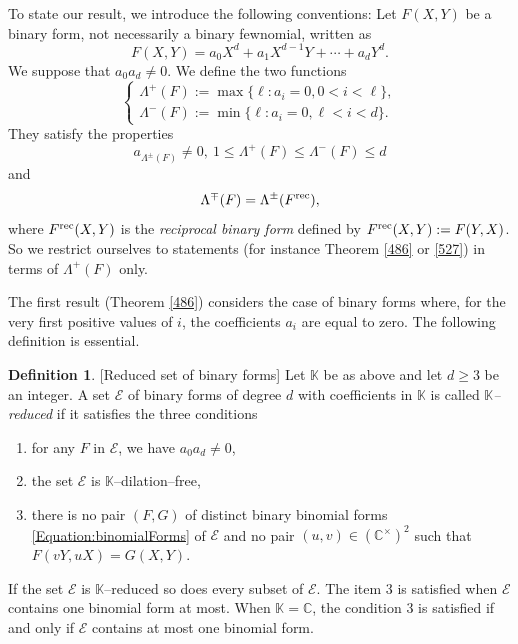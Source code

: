 \documentclass[10pt]{article}
\theoremstyle{definition}
\newtheorem{definition}[theorem]{Definition}
\numberwithin{equation}{section}
\newcommand {\C}{{\mathbb{C}}}
\newcommand {\K}{{\mathbb{K}}}
\begin{document}
To state our result, we introduce the following conventions: Let $F(X,Y)$ be a binary form, not necessarily a binary fewnomial, written as
\begin{equation}\label{defF}
F(X,Y) =a_0 X^d+a_1 X^{d-1} Y + \cdots +a_d Y^d.
\end{equation}
We suppose that $a_0a_d \neq 0$. We define the two functions
\begin{equation}\label{defLambda}
\begin{cases}
\Lambda^+ (F) := \max\{ \ell : a_i= 0, 0 < i <\ell \},\\
\Lambda^- (F) := \min \{\ell : a_i=0, \ell < i < d\}.
\end{cases}
\end{equation}
They satisfy the properties 
\[
a_{\Lambda^\pm (F)} \neq 0,\ 1\leqslant \Lambda^+ (F) \leqslant \Lambda^- (F) \leqslant d 
\] 
and
\[
\Lambda^\mp (F) = \Lambda^\pm (F^{\rm rec}),
\] 
where 
$F^{\rm rec} (X,Y)$ is the {\em reciprocal binary form} defined by $F^{\rm rec} (X,Y) := F(Y,X)$. So 
we restrict ourselves to statements (for instance Theorem \ref{486} or \ref{527}) in terms of $\Lambda^+ (F)$ only.

The first result (Theorem \ref{486}) considers the case of binary forms where, for the very first positive values of $i$, the coefficients $a_i$ are equal to zero. The following definition is essential. 
\begin{definition}\label{Def:reduced}[Reduced set of binary forms]
 Let $\K$ be as above and let $d\geqslant 3$ be an integer. A set $\mathcal E$ of binary forms of degree $d$ with coefficients in $\K$ 
 is called {\em $\K$--reduced} 
 if it satisfies the three conditions 
\begin{enumerate}
\item for any $F$ in $\mathcal E $, we have $a_0a_d \not= 0$, 
\item the set $\mathcal E $ is $\K$--dilation--free, 
\item there is no pair $(F,G)$ of distinct binary binomial forms \eqref{Equation:binomialForms} of $\mathcal E$ and no pair $(u,v) \in (\mathbb C^\times)^2$ such that $F(vY,uX) =G(X,Y)$. 
\end{enumerate}
\end{definition}
If the set $\mathcal E$ is $\K$--reduced 
so does every subset of $\mathcal E$.
The item 3 is satisfied when $\mathcal E$ contains one binomial form at most. 
When $\K = \C$, the condition 3 is satisfied if and only if ${\mathcal E}$ contains at most one binomial form. 
\end{document}
